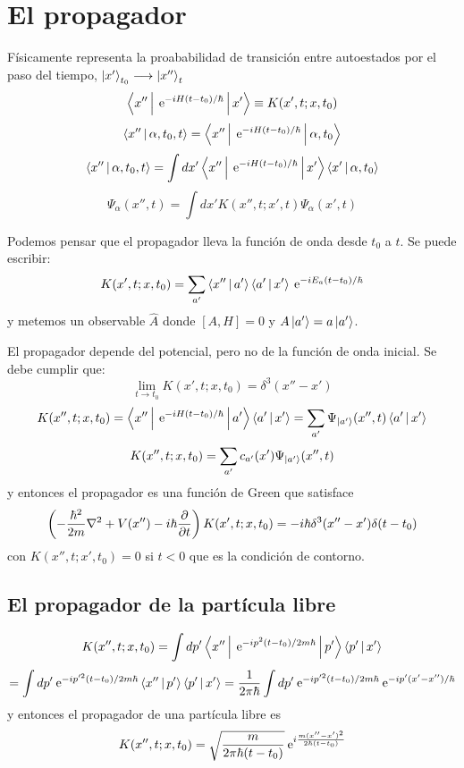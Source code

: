 \documentclass[10pt,oneside]{CBFT_book}
\begin{document}
\section{El propagador}

Físicamente representa la proababilidad de transición entre autoestados por el paso del tiempo,
$ \Ket{x'}_{t_0} \longrightarrow \Ket{x''}_t$
\[
	\Braket{x''|\:\mathrm{e}^{-iH(t-t_0)/\hbar}|x'} \equiv K(x',t; x, t_0)
\]
\[
	\Braket{x''| \alpha,t_0,t} = \Braket{x''|\:\mathrm{e}^{-iH(t-t_0)/\hbar}|\alpha,t_0} 
\]
\[
	\Braket{x''| \alpha,t_0,t} = \int dx' \Braket{x''|\:\mathrm{e}^{-iH(t-t_0)/\hbar}|x'}\Braket{x'|\alpha,t_0} 
\]
\[
	\Psi_{\alpha}(x'',t) = \int dx' K(x'',t; x',t) \Psi_{\alpha}(x',t)
\]

Podemos pensar que el propagador lleva la función de onda desde $t_0$ a $t$. Se puede escribir:
\[
	K(x',t; x, t_0) = \sum_{a'} \Braket{x''|a'} \Braket{a'|x'} \:\mathrm{e}^{-iE_a(t-t_0)/\hbar}
\]
y metemos un observable $\hat{A}$ donde $[A,H]=0$ y $A\Ket{a'}=a\Ket{a'}$.

El propagador depende del potencial, pero no de la función de onda inicial. Se debe cumplir que:
\[
	\lim_{t\to t_0} K(x',t; x, t_0) = \delta^3(x''-x')
\]
\[
	K(x'',t; x, t_0) = \Braket{x''|\:\mathrm{e}^{-iH(t-t_0)/\hbar}|a'} \Braket{a'|x'} =
		\sum_{a'} \Psi_{\Ket{a'}}(x'',t)\Braket{a'|x'}
\]
\[
	K(x'',t; x, t_0) = \sum_{a'} c_{a'}(x')\Psi_{\Ket{a'}}(x'',t)
\]
y entonces el propagador es una función de Green que satisface 
\[
	\left( -\frac{\hbar^2}{2m}\nabla^2 +V(x'') - i\hbar\frac{\partial^{\hspace{-0.05em}} {}}{\partial {t}^{\hspace{-0.05em}}} \right)K(x',t; x, t_0) =
		- i\hbar \delta^3(x''-x') \delta(t-t_0)
\]
con $K(x'',t;x',t_0)=0 $ si $t<0$ que es la condición de contorno.

\subsection{El propagador de la partícula libre}

\[
	K(x'',t; x, t_0) = \int dp' \Braket{x''|\:\mathrm{e}^{-ip^2(t-t_0)/2m\hbar}|p'} \Braket{p'|x'} 
\]
\[
	= \int dp' \:\mathrm{e}^{-ip'^{2}(t-t_0)/2m\hbar} \Braket{x''|p'} \Braket{p'|x'} =
	\frac{1}{2\pi\hbar} \int dp' \:\mathrm{e}^{-ip'^{2}(t-t_0)/2m\hbar} \:\mathrm{e}^{-ip'(x'-x'')/\hbar}
\]
y entonces el propagador de una partícula libre es
\[
	K(x'',t; x, t_0) = \sqrt{ \frac{m}{2\pi\hbar(t-t_0)} } \:\mathrm{e}^{i\frac{m(x''-x')^2}{2\hbar(t-t_0)}}
\]
\end{document}
